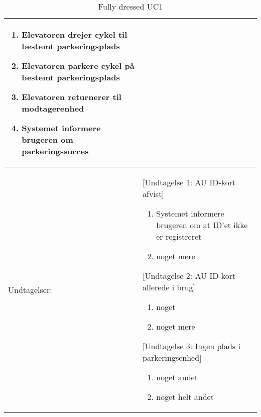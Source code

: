\documentclass[../main.tex]{subfiles}
\begin{document}
\begin{table}[H]
\begin{tabularx}{\textwidth}{|l|X|}
\begin{enumerate}
        \item Elevatoren drejer cykel til bestemt parkeringsplads
        \item Elevatoren parkere cykel på bestemt parkeringsplads
        \item Elevatoren returnerer til modtagerenhed
        \item Systemet informere brugeren om parkeringssucces
    \end{enumerate} \\\hline\rowcolor[HTML]{DFDFDF}
    Undtagelser:                    & {[Undtagelse 1: AU ID-kort afvist]}
    \setlist{nolistsep}
    \begin{enumerate}
        \item Systemet informere brugeren om at ID'et ikke er registreret
        \item noget mere
    \end{enumerate}
                                    {[Undtagelse 2: AU ID-kort allerede i brug]}
    \setlist{nolistsep}
    \begin{enumerate}
        \item noget
        \item noget mere
    \end{enumerate}
                                    {[Undtagelse 3: Ingen plads i parkeringsenhed]} 
    \setlist{nolistsep}
    \begin{enumerate}
        \item noget andet
        \item noget helt andet
    \end{enumerate}
    \\ \hline
\end{tabularx}
    \caption{Fully dressed UC1}
    \label{tab:UC1}
\end{table}
\end{document}

